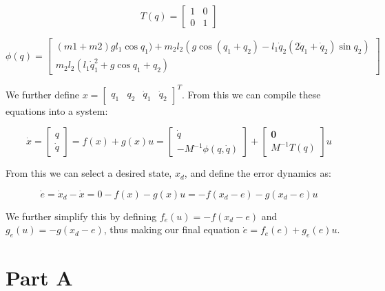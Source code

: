 \documentclass{article}
\begin{document}
\begin{equation}
    T(q) = \begin{bmatrix}1 & 0 \\ 0 & 1\end{bmatrix}
\end{equation}

\begin{equation}
    \phi(q) = \begin{bmatrix}
        (m1+m2)gl_1\cos{q_1)+m_2l_2(g\cos(q_1+q_2)-l_1\dot{q}_2(2\dot{q}_1+\dot{q}_2)\sin{q_2})}
        \\
        m_2l_2(l_1\dot{q}_1^2+g\cos{q_1+q_2})
    \end{bmatrix}
\end{equation}

We further define $x = \begin{bmatrix} q_1 & q_2 & \dot{q}_1 & \dot{q}_2 \end{bmatrix}^T$. From this we can compile these equations into a system:

\begin{equation}
    \dot{x} = \begin{bmatrix}
        q \\ \dot{q}
    \end{bmatrix} =
    f(x) + g(x)u
    =
    \begin{bmatrix}
        \dot{q} \\
        -M^{-1}\phi(q, \dot{q})
    \end{bmatrix} + 
    \begin{bmatrix}
        \boldsymbol{0} \\
        M^{-1}T(q)
    \end{bmatrix} u
\end{equation}

From this we can select a desired state, $x_d$, and define the error dynamics as:

\begin{equation}
    \dot{e} = \dot{x}_d - \dot{x} = 0 - f(x) - g(x)u = -f(x_d - e)-g(x_d-e)u
\end{equation}

We further simplify this by defining $f_e(u) = -f(x_d - e)$ and $g_e(u) = -g(x_d-e)$, thus making our final equation $\dot{e}=f_e(e)+g_e(e)u$.

\section*{Part A}
\end{document}
